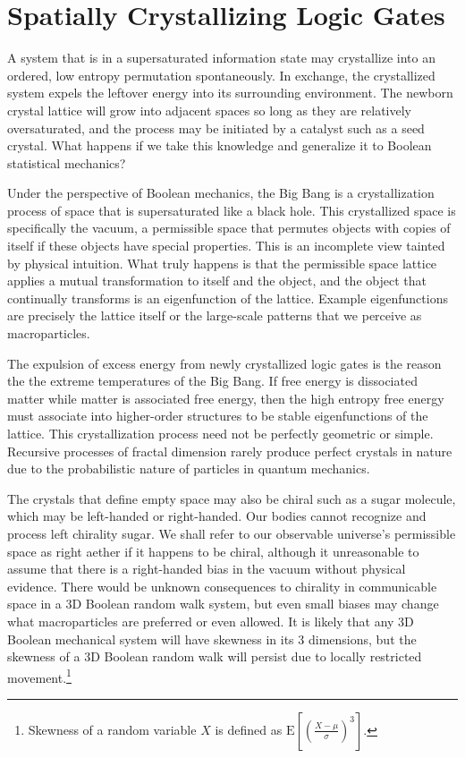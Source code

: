 \documentclass[10pt, a5paper, twoside, openright]{memoir}
\begin{document}
\section{Spatially Crystallizing Logic Gates}
A system that is in a supersaturated information state may crystallize into an ordered, low entropy permutation spontaneously. In exchange, the crystallized system expels the leftover energy into its surrounding environment. The newborn crystal lattice will grow into adjacent spaces so long as they are relatively oversaturated, and the process may be initiated by a catalyst such as a seed crystal. What happens if we take this knowledge and generalize it to Boolean statistical mechanics?

Under the perspective of Boolean mechanics, the Big Bang is a crystallization process of space that is supersaturated like a black hole. This crystallized space is specifically the vacuum, a permissible space that permutes objects with copies of itself if these objects have special properties. This is an incomplete view tainted by physical intuition. What truly happens is that the permissible space lattice applies a mutual transformation to itself and the object, and the object that continually transforms is an eigenfunction of the lattice. Example eigenfunctions are precisely the lattice itself or the large-scale patterns that we perceive as macroparticles.

The expulsion of excess energy from newly crystallized logic gates is the reason the the extreme temperatures of the Big Bang. If free energy is dissociated matter while matter is associated free energy, then the high entropy free energy must associate into higher-order structures to be stable eigenfunctions of the lattice. This crystallization process need not be perfectly geometric or simple. Recursive processes of fractal dimension rarely produce perfect crystals in nature due to the probabilistic nature of particles in quantum mechanics.

The crystals that define empty space may also be chiral such as a sugar molecule, which may be left-handed or right-handed. Our bodies cannot recognize and process left chirality sugar. We shall refer to our observable universe's permissible space as right aether if it happens to be chiral, although it unreasonable to assume that there is a right-handed bias in the vacuum without physical evidence. There would be unknown consequences to chirality in communicable space in a 3D Boolean random walk system, but even small biases may change what macroparticles are preferred or even allowed. It is likely that any 3D Boolean mechanical system will have skewness in its 3 dimensions, but the skewness of a 3D Boolean random walk will persist due to locally restricted movement.\footnote{Skewness of a random variable $X$ is defined as $\mathrm{E}[(\frac{X-\mu}{\sigma})^3]$.}
\end{document}
